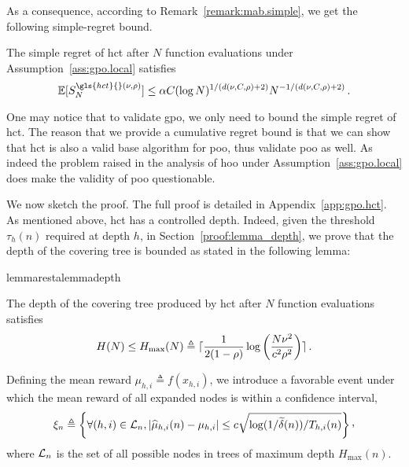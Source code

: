 As a consequence, according to Remark~\ref{remark:mab.simple}, we get the following simple-regret bound.
\begin{corollary}\label{col}
\begin{leftbar}[corollarybar]
The simple regret of \gls{hct} after $N$ function evaluations under Assumption~\ref{ass:gpo.local} satisfies
\[
	\mathbb{E}[S_N^{\gls{hct}{}(\nu,\rho)}] \leq \alpha C(\log N)^{1/(d(\nu,C,\rho)+2)}N^{-1/(d(\nu,C,\rho)+2)}\,.
\]
\end{leftbar}
\end{corollary}

\begin{remark}\label{remark:gpo.hct}
\begin{leftbar}[remarkbar]
One may notice that to validate \gls{gpo}, we only need to bound the simple regret of \gls{hct}. The reason that we provide a cumulative regret bound is that we can show that \gls{hct} is also a valid base algorithm for \gls{poo}, thus validate \gls{poo} as well. As indeed the problem raised in the analysis of \gls{hoo} under Assumption~\ref{ass:gpo.local} does make the validity of \gls{poo} questionable.
\end{leftbar}
\end{remark}

We now sketch the proof. The full proof is detailed in Appendix~\ref{app:gpo.hct}. As  mentioned above, \gls{hct} has a controlled depth. Indeed, given the threshold $\tau_h(n)$ required at depth $h$, in Section~\ref{proof:lemma_depth}, we prove that the depth of the covering tree is bounded as stated in the following lemma:
\begin{restatable}{lemma}{restalemmadepth}\label{lemma_depth}
\begin{leftbar}[lemmabar]
The depth of the covering tree produced by \gls{hct} after $N$ function evaluations satisfies 
\[
    H(N) \leq H_{\max}(N) \triangleq \lceil\frac{1}{2(1-\rho)} \log\left( \frac{N\nu^2}{c^2\rho^2} \right)\rceil\,.
\]
\end{leftbar}
\end{restatable}
\noindent
Defining the mean reward $\mu_{h,i} \triangleq f(x_{h,i})$, we introduce a favorable event under which the mean reward of all expanded nodes is within a confidence interval,
\[
	\xi_n \triangleq \left\{ \forall (h,i)\in\mathcal{L}_n,  |\hat{\mu}_{h,i}(n) - \mu_{h,i}| \leq c\sqrt{\operatorname{log}(1/\tilde{\delta}(n))/T_{h,i}(n)} \right\}\CommaBin
\]
where $\mathcal{L}_n$ is the set of all possible nodes in trees of maximum depth $H_{\max}(n)$.

